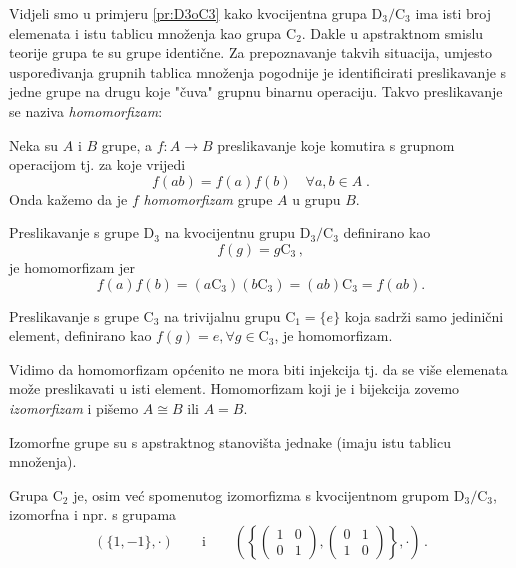 Vidjeli smo u primjeru \ref{pr:D3oC3} kako kvocijentna grupa $\mathrm{D}_3/\mathrm{C}_3$
ima isti broj elemenata i istu tablicu množenja kao grupa $\mathrm{C}_2$. Dakle u
apstraktnom smislu teorije grupa te su grupe identične.  Za prepoznavanje takvih
situacija, umjesto uspoređivanja grupnih tablica množenja pogodnije je identificirati
preslikavanje s jedne grupe na drugu koje "čuva" grupnu binarnu operaciju. Takvo preslikavanje
se naziva \emph{homomorfizam}:
\begin{definicija}[Homomorfizam]
Neka su $A$ i $B$ grupe, a $f:A\to B$ preslikavanje koje komutira
s grupnom operacijom tj. za koje vrijedi
\begin{displaymath}
      f(ab)=f(a)f(b) \quad \forall a,b\in A \;.
\end{displaymath}
Onda kažemo da je $f$ \emph{homomorfizam} grupe $A$ u grupu $B$.
\end{definicija}

\begin{primjer}
    Preslikavanje s grupe $\mathrm{D}_3$ na kvocijentnu grupu
    $\mathrm{D}_3/\mathrm{C}_3$ definirano kao 
    \[
        f(g) = g\mathrm{C}_3 \,,
    \] je homomorfizam jer
    \[
        f(a) f(b) = (a \mathrm{C}_3) (b \mathrm{C}_3 ) =
        (a b) \mathrm{C}_3 = f(a b)
    .\] 
\end{primjer}
\begin{primjer}
    Preslikavanje s grupe $\mathrm{C}_3$ na trivijalnu grupu $\mathrm{C}_1 = \{e\}$
    koja sadrži samo jedinični element, definirano kao $f(g) = e,
    \forall g\in\mathrm{C}_3$, je homomorfizam.
    \label{pr:C3toC1}
\end{primjer}

Vidimo da homomorfizam općenito ne mora biti injekcija tj. da se više
elemenata može preslikavati u isti element.
Homomorfizam koji je i bijekcija zovemo \emph{izomorfizam} i
pišemo $A\cong B$ ili $A=B$.

Izomorfne grupe su s apstraktnog stanovišta jednake (imaju
istu tablicu množenja).

\begin{primjer}
Grupa C$_2$ je, osim već spomenutog izomorfizma s
kvocijentnom grupom $\mathrm{D}_3/\mathrm{C}_3$, izomorfna i
npr. s grupama 
$$
(\{1, -1\},\cdot) \qquad \text{i} \qquad \left(\left\{
\begin{pmatrix}
1 & 0 \\ 0 & 1
\end{pmatrix},
\begin{pmatrix}
0 & 1 \\ 1 & 0
\end{pmatrix}
\right\},\cdot\right)\,.$$
\end{primjer}

